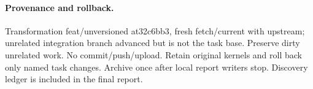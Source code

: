 \documentclass{article}
\begin{document}
\paragraph{Provenance and rollback.} Transformation feat/unversioned at32c6bb3,
fresh fetch/current with upstream; unrelated integration branch advanced but is
not the task base. Preserve dirty unrelated work. No commit/push/upload. Retain
original kernels and roll back only named task changes. Archive once after local
report writers stop. Discovery ledger is included in the final report.
\begin{center}\end{center}
\end{document}
